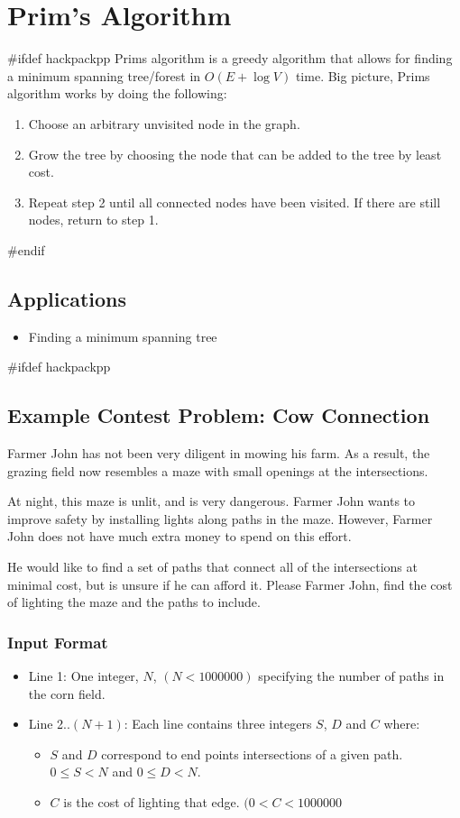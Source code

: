 \section{Prim's Algorithm}
#ifdef hackpackpp
Prims algorithm is a greedy algorithm that allows for finding a minimum spanning tree/forest in $O(E + \log{V})$ time.
Big picture, Prims algorithm works by doing the following:

\begin{enumerate}
	\item Choose an arbitrary unvisited node in the graph.
	\item Grow the tree by choosing the node that can be added to the tree by least cost.
	\item Repeat step 2 until all connected nodes have been visited. If there are still nodes, return to step 1.
\end{enumerate}

#endif
\subsection{Applications}
\begin{itemize}
	\item Finding a minimum spanning tree
\end{itemize}

#ifdef hackpackpp
\subsection{Example Contest Problem: Cow Connection}
Farmer John has not been very diligent in mowing his farm.
As a result, the grazing field now resembles a maze with small openings at the intersections.

At night, this maze is unlit, and is very dangerous.
Farmer John wants to improve safety by installing lights along paths in the maze.
However, Farmer John does not have much extra money to spend on this effort.

He would like to find a set of paths that connect all of the intersections at minimal cost, but is unsure if he can afford it.
Please Farmer John, find the cost of lighting the maze and the paths to include.
\subsubsection{Input Format}
\begin{itemize}
\item Line 1: One integer, $N$, $(N < 1000000)$ specifying the number of paths in the corn field.
\item Line 2..$(N+1)$: Each line contains three integers $S$, $D$ and $C$ where:
	\begin{itemize}
		\item $S$ and $D$ correspond to end points intersections of a given path. $0 \leq S < N$ and $0 \leq D < N$.
		\item $C$ is the cost of lighting that edge. $(0 < C < 1000000$
	\end{itemize}
\end{itemize}

